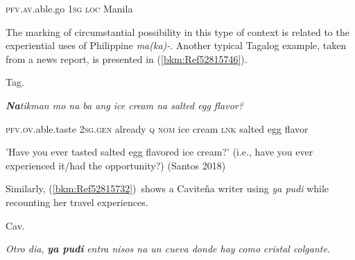 \begin{stylelsIMT}
\textsc{pfv}.\textsc{av}.able.go \textsc{1sg} \textsc{loc} Manila
\end{stylelsIMT}

\begin{styleStandard}
The marking of circumstantial possibility in this type of context is related to the experiential uses of Philippine \textit{ma(ka)-}. Another typical Tagalog example, taken from a news report, is presented in (\ref{bkm:Ref52815746}).
\end{styleStandard}

\begin{listWWNumiileveli}
\item 
\begin{stylelsLanginfo}
\label{bkm:Ref52815746}Tag.
\end{stylelsLanginfo}
\end{listWWNumiileveli}
\begin{stylelsLanginfo}
\textbf{\textit{Na}}\textit{tikman mo na ba ang ice cream na salted egg flavor?}
\end{stylelsLanginfo}

\begin{stylelsLanginfo}
\textsc{pfv.ov}.able.taste 2\textsc{sg.gen} already \textsc{q nom} ice cream \textsc{lnk} salted egg flavor
\end{stylelsLanginfo}

\begin{stylelsLanginfo}
{}'Have you ever tasted salted egg flavored ice cream?' (i.e., have you ever experienced it/had the opportunity?) (Santos 2018)
\end{stylelsLanginfo}

\begin{styleStandard}
Similarly, (\ref{bkm:Ref52815732})\ shows a Caviteña writer using \textit{ya pudi} while recounting her travel experiences.
\end{styleStandard}

\begin{listWWNumiileveli}
\item 
\begin{stylelsLanginfo}
\label{bkm:Ref52815732}Cav.
\end{stylelsLanginfo}
\end{listWWNumiileveli}
\begin{stylelsLanginfo}
\textit{Otro dia, }\textbf{\textit{ya pudi}}\textit{ entra nisos na un cueva donde hay como cristal colgante.}
\end{stylelsLanginfo}

